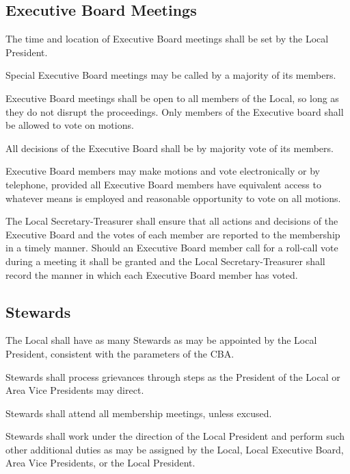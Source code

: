 \documentclass[11pt]{article}
\newcommand{\articlesection}[1]{\vspace{.25cm}\subsection{#1}}
\begin{document}
\articlesection{Executive Board Meetings}
\begin{paralist}
  \item The time and location of Executive Board meetings shall be set by the Local President.
  \item Special Executive Board meetings may be called by a majority of its members.
  \item Executive Board meetings shall be open to all members of the Local, so long as they do not disrupt the proceedings. Only members of the Executive board shall be allowed to vote on motions.
  \item All decisions of the Executive Board shall be by majority vote of its members.
  \item Executive Board members may make motions and vote electronically or by telephone, provided all Executive Board members have equivalent access to whatever means is employed and reasonable opportunity to vote on all motions.
  \item The Local Secretary-Treasurer shall ensure that all actions and decisions of the Executive Board and the votes of each member are reported to the membership in a timely manner. Should an Executive Board member call for a roll-call vote during a meeting it shall be granted and the Local Secretary-Treasurer shall record the manner in which each Executive Board member has voted.
\end{paralist}

\articlesection{Stewards}
\begin{paralist}
  \item The Local shall have as many Stewards as may be appointed by the Local President, consistent with the parameters of the CBA.
  \item Stewards shall process grievances through steps as the President of the Local or Area Vice Presidents may direct.
  \item Stewards shall attend all membership meetings, unless excused.
  \item Stewards shall work under the direction of the Local President and perform such other additional duties as may be assigned by the Local, Local Executive Board, Area Vice Presidents, or the Local President.
\end{paralist}
\end{document}
